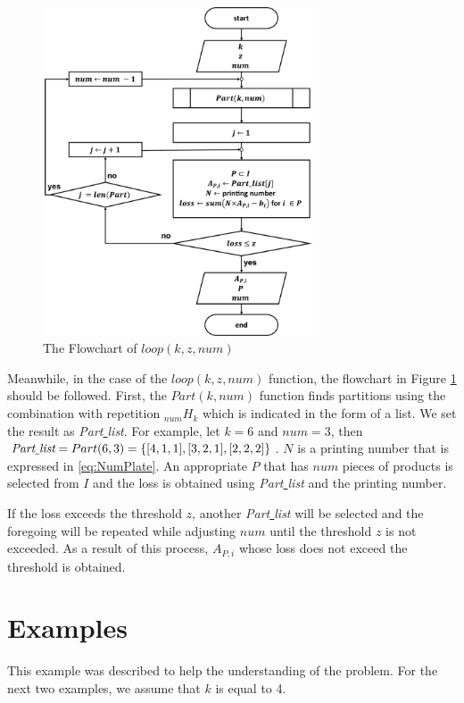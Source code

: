\documentclass[a4paper]{amsart}
\numberwithin{equation}{section} %
\numberwithin{figure}{section} %
\numberwithin{table}{section}
\theoremstyle{plain}
\theoremstyle{definition}
\theoremstyle{plain}
\theoremstyle{plain}
\theoremstyle{plain}
\theoremstyle{plain}
\theoremstyle{plain}
\begin{document}
\begin{figure}[h!]
	\centering
	\includegraphics[width=8cm]{SubFChart.pdf}
	\caption{The Flowchart of ${loop}(k, z, num)$}
	\label{fig:SFChart}       %
\end{figure}

Meanwhile, in the case of the ${loop}(k, z, num)$ function, the flowchart in Figure \ref{fig:SFChart} should be followed.
First, the ${Part}(k, num)$ function finds partitions using the combination with repetition $_{num}H_{k}$ which is indicated in the form of a list. 
We set the result as {\it Part\underline{ }list}.
For example, let $k=6$ and $num=3$, then $\text{\it Part\underline{ }list}={Part}(6, 3) = \{ [4,1,1],[3,2,1],[2,2,2] \}$.
$N$ is a printing number that is expressed in \eqref{eq:NumPlate}.
An appropriate $P$ that has $num$ pieces of products is selected from $I$ and the loss is obtained using {\it Part\underline{ }list} and the printing number.

If the loss exceeds the threshold $z$, another {\it Part\underline{ }list} will be selected and the foregoing will be repeated  while adjusting $num$ until the threshold $z$ is not exceeded.
As a result of this process, $A_{P,i}$ whose loss does not exceed the threshold is obtained.%



\section{Examples}\label{sec:Exam}
This example was described to help the understanding of the problem. For the next two examples, we assume that $k$ is equal to 4.
\end{document}
